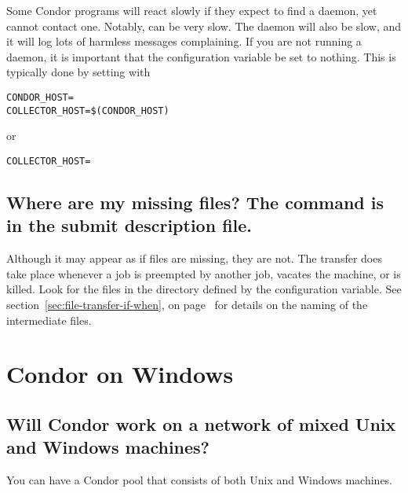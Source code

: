 Some Condor programs will react slowly if they expect to find a
 daemon, yet cannot contact one.
Notably,  can be very slow.
The  daemon will also be slow,
and it will log lots of harmless messages complaining.
If you are not running a  daemon,
it is important that the configuration variable
 be set to nothing.
This is typically done by setting  with
\footnotesize
\begin{verbatim}
CONDOR_HOST=
COLLECTOR_HOST=$(CONDOR_HOST)
\end{verbatim}
\normalsize
or
\footnotesize
\begin{verbatim}
COLLECTOR_HOST=
\end{verbatim}
\normalsize

\subsection*{Where are my missing files?  The command  is in the submit description file.}
Although it may appear as if files are missing,
they are not.
The transfer does take place whenever a job is 
preempted by another job, vacates the machine, or is killed.
Look for the files in the directory defined by
the  configuration variable.
See
section~\ref{sec:file-transfer-if-when}, on
page~\pageref{sec:file-transfer-if-when} for details on the naming
of the intermediate files.


\section{Condor on Windows}

\subsection*{Will Condor work on a network of mixed Unix and Windows machines?}

You can have a Condor pool that consists of both Unix and Windows machines.

